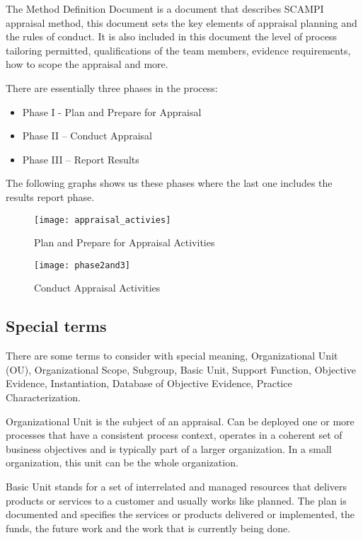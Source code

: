 The Method Definition Document is a document that describes SCAMPI appraisal method, this document sets the key elements of appraisal planning and the rules of conduct. It is also included in this document the level of process tailoring permitted, qualifications of the team members, evidence requirements, how to scope the appraisal and more.

There are essentially three phases in the process:
\begin{itemize}
	\item Phase I - Plan and Prepare for Appraisal 
	\item Phase II – Conduct Appraisal
	\item Phase III – Report Results
\end{itemize}

The following graphs shows us these phases where the last one includes the results report phase.

\begin{figure}[h]
	\begin{center}
		\leavevmode
		\texttt{[image: appraisal\_activies]}
		\caption{Plan and Prepare for Appraisal Activities}
		\label{fig:plan_appraisal}
	\end{center}
\end{figure}


\begin{figure}[h]
	\begin{center}
		\leavevmode
		\texttt{[image: phase2and3]}
		\caption{Conduct Appraisal Activities}
		\label{fig:results_appraisal}
	\end{center}
\end{figure}

\subsection{Special terms}
There are some terms to consider with special meaning, Organizational Unit (OU), Organizational Scope, Subgroup, Basic Unit, Support Function, Objective Evidence, Instantiation, Database of Objective Evidence, Practice Characterization.

Organizational Unit is the subject of an appraisal. Can be deployed one or more processes that have a consistent process context, operates in a coherent set of business objectives and is typically part of a larger organization. In a small organization, this unit can be the whole organization.

Basic Unit stands for a set of interrelated and managed resources that delivers products or services to a customer and usually works like planned. The plan is documented and specifies the services or products delivered or implemented, the funds, the future work and the work that is currently being done.

